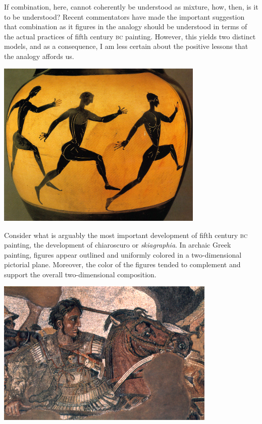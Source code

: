 If combination, here, cannot coherently be understood as mixture, how, then, is it to be understood? Recent commentators have made the important suggestion that combination as it figures in the analogy should be understood in terms of the actual practices of fifth century \textsc{bc} painting. However, this yields two distinct models, and as a consequence, I am less certain about the positive lessons that the analogy affords us. \change

\begin{frame}
	\begin{center}
		\includegraphics[height=8cm]{../../graphics/archaic.jpg}
	\end{center}
\end{frame}

Consider what is arguably the most important development of fifth century \textsc{bc} painting, the development of chiaroscuro or \emph{skiagraphia}. In archaic Greek painting, figures appear outlined and uniformly colored in a two-dimensional pictorial plane. Moreover, the color of the figures tended to complement and support the overall two-dimensional composition. \change

\begin{frame}
	\begin{center}
		\includegraphics[height=7cm]{../../graphics/alexander.jpg}
	\end{center}
\end{frame}

